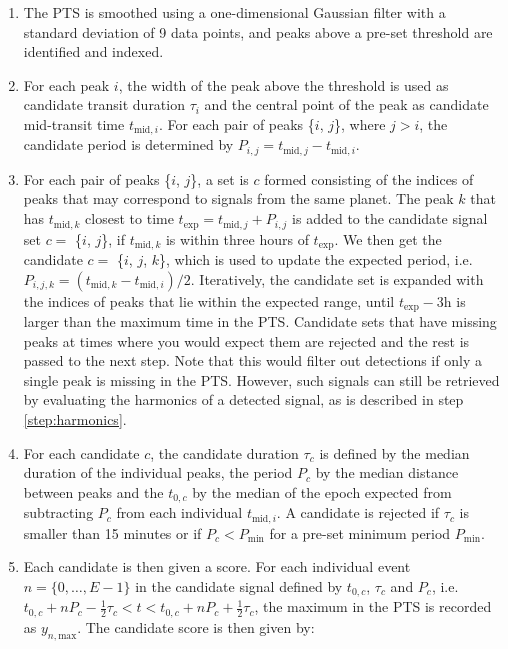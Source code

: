 \begin{enumerate}
    \item The PTS is smoothed using a one-dimensional Gaussian filter with a standard deviation of 9 data points, and peaks above a pre-set threshold are identified and indexed.
    \item For each peak $i$, the width of the peak above the threshold is used as candidate transit duration $\tau_i$ and the central point of the peak as candidate mid-transit time $t_{\text{mid},i}$. For each pair of peaks \{$i$, $j$\}, where $j>i$, the candidate period is determined by $P_{i,j} = t_{\text{mid},j} - t_{\text{mid},i}$.
    \item  For each pair of peaks \{$i$, $j$\}, a set is $c$ formed consisting of the indices of peaks that may correspond to signals from the same planet. The peak $k$ that has $t_{\text{mid},k}$ closest to time $t_{\text{exp}} = t_{\text{mid},j} + P_{i,j}$ is added to the candidate signal set $c=$ \{$i$, $j$\}, if $t_{\text{mid},k}$ is within three hours of $t_{\text{exp}}$. We then get the candidate $c=$ \{$i$, $j$, $k$\}, which is used to update the expected period, i.e. $P_{i,j,k} = (t_{\text{mid},k} - t_{\text{mid},i})/2$. Iteratively, the candidate set is expanded with the indices of peaks that lie within the expected range, until $t_{\text{exp}} - 3\text{h}$  is larger than the maximum time in the PTS. Candidate sets that have missing peaks at times where you would expect them are rejected and the rest is passed to the next step. Note that this would filter out detections if only a single peak is missing in the PTS. However, such signals can still be retrieved by evaluating the harmonics of a detected signal, as is described in step \ref{step:harmonics}.
    \item For each candidate $c$, the candidate duration $\tau_c$ is defined by the median duration of the individual peaks, the period $P_c$ by the median distance between peaks and the $t_{0,c}$ by the median of the epoch expected from subtracting $P_c$ from each individual $t_{\text{mid},i}$. A candidate is rejected if $\tau_c$ is smaller than 15 minutes or if $P_c < P_{\text{min}}$ for a pre-set minimum period $P_{\text{min}}$.
    \item\label{step:score} Each candidate is then given a score. For each individual event $n = \{0,\dots,E-1\}$ in the candidate signal defined by $t_{0,c}$, $\tau_c$ and $P_c$, i.e. $t_{0,c} + nP_c - \frac{1}{2}\tau_c< t < t_{0,c} + nP_c + \frac{1}{2}\tau_c$, the maximum in the PTS is recorded as $y_{n,\text{max}}$. The candidate score is then given by:

\end{enumerate}
